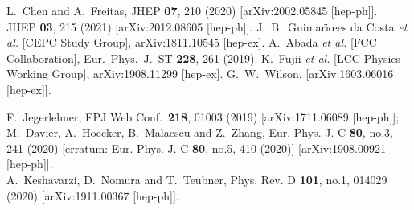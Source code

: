 \documentclass[Physsubmission, Phys]{SciPost}
\begin{document}
\begin{thebibliography}{100}
L.~Chen and A.~Freitas,
JHEP \textbf{07}, 210 (2020)
[arXiv:2002.05845 [hep-ph]].\\
JHEP \textbf{03}, 215 (2021)
[arXiv:2012.08605 [hep-ph]].
 J.~B.~Guimar\"\i\textquestiondown\oe es da Costa {\it et al.} [CEPC Study Group],
  arXiv:1811.10545 [hep-ex].
%
 A.~Abada {\it et al.} [FCC Collaboration],
  Eur.\ Phys.\ J.\ ST {\bf 228}, 261 (2019).
%  
K.~Fujii \textit{et al.} [LCC Physics Working Group],
arXiv:1908.11299 [hep-ex].
%
G.~W.~Wilson,
[arXiv:1603.06016 [hep-ex]].



  F.~Jegerlehner,
  EPJ Web Conf.\  {\bf 218}, 01003 (2019)
  [arXiv:1711.06089 [hep-ph]];\\
M.~Davier, A.~Hoecker, B.~Malaescu and Z.~Zhang,
Eur. Phys. J. C \textbf{80}, no.3, 241 (2020)
[erratum: Eur. Phys. J. C \textbf{80}, no.5, 410 (2020)]
[arXiv:1908.00921 [hep-ph]].\\
A.~Keshavarzi, D.~Nomura and T.~Teubner,
Phys. Rev. D \textbf{101}, no.1, 014029 (2020)
[arXiv:1911.00367 [hep-ph]].



\end{thebibliography}
\end{document}
